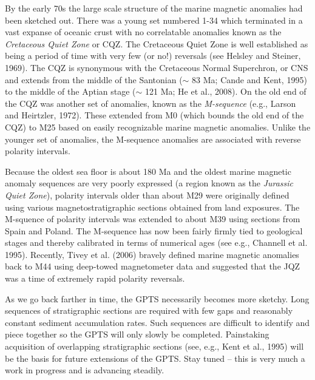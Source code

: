 By the early 70s  the large scale structure of the marine magnetic anomalies had been sketched out.  There was a young set numbered 1-34 which terminated in a vast expanse of oceanic crust with no correlatable anomalies known as the 
{\it Cretaceous Quiet Zone} or CQZ.   The Cretaceous Quiet Zone is well established as being a period of time with very few (or no!) reversals (see 
Helsley and Steiner, 1969). \nocite{helsley69}  The CQZ is synonymous with the Cretaceous Normal Superchron, or CNS and extends from the middle of the Santonian ($\sim$ 83 Ma; 
Cande and Kent, 1995) \nocite{cande95} to the middle of the Aptian stage ($\sim$ 121 Ma; 
He et al., 2008). \nocite{he08}  
On the old end of the CQZ was another set of anomalies,  known as the 
{\it M-sequence}   (e.g., 
Larson and Heirtzler, 1972).  \nocite{larson72}    These extended from M0 (which bounds the old end of the  CQZ)  to M25 based on easily recognizable marine magnetic anomalies.      Unlike the younger set of anomalies, the M-sequence anomalies are associated with reverse polarity intervals.    


Because the oldest sea floor is about 180 Ma and the oldest marine magnetic anomaly sequences are very poorly expressed (a region known as the  
{\it Jurassic Quiet Zone}), polarity intervals older than  about M29 were originally defined 
 using various magnetostratigraphic  sections obtained from land exposures.   
The M-squence of polarity intervals was extended to about M39 using sections from  Spain and Poland.  The M-sequence has now been fairly firmly tied to geological stages  and thereby calibrated in terms of numerical ages (see e.g., 
Channell et al. 1995).  \nocite{channell95}   Recently, Tivey et al. (2006) \nocite{tivey06} bravely defined marine magnetic anomalies back to M44 using deep-towed magnetometer data and suggested that the JQZ was a time of extremely rapid polarity reversals.  

As we go back farther in time, the GPTS  necessarily becomes  more sketchy.  Long sequences of stratigraphic sections are required with few gaps and reasonably constant sediment accumulation rates.   Such sequences are difficult to identify and piece together so the GPTS will only slowly be completed.  Painstaking acquisition of  overlapping stratigraphic sections (see, e.g., 
Kent et al., 1995) will be the basis for future extensions  of the GPTS.  Stay tuned -- this is very much a work in progress and is advancing steadily.    





